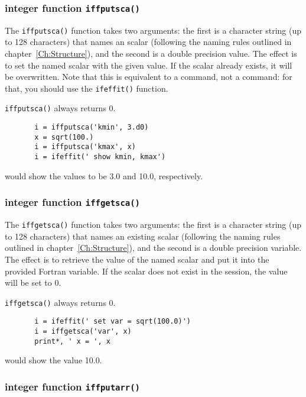 \subsubsection{integer function {\tt{iffputsca()}}}\label{Ch:Script-f77:putscalar}

{}
The {\tt{iffputsca()}} function takes two arguments: the first is a
character string (up to 128 characters) that names an {\ifeffit} scalar
(following the naming rules outlined in chapter~\ref{Ch:Structure}), and
the second is a double precision value.  The effect is to set the named
scalar with the given value.  If the scalar already exists, it will be
overwritten.  Note that this is equivalent to a {} command, not
a {} command: for that, you should use the {\tt{ifeffit()}}
function.


{\tt{iffputsca()}} always returns 0.

\begin{verbatim}
       i = iffputsca('kmin', 3.d0)
       x = sqrt(100.)
       i = iffputsca('kmax', x)
       i = ifeffit(' show kmin, kmax')
\end{verbatim}
\noindent
would show the values to be 3.0 and 10.0, respectively.

\subsubsection{integer function {\tt{iffgetsca()}}}\label{Ch:Script-f77:getscalar}

{}
The {\tt{iffgetsca()}} function takes two arguments: the first is a
character string (up to 128 characters) that names an existing {\ifeffit}
scalar (following the naming rules outlined in chapter~\ref{Ch:Structure}),
and the second is a double precision variable.  The effect is to retrieve
the value of the named {\ifeffit} scalar and put it into the provided
Fortran variable.  If the scalar does not exist in the {\ifeffit} session,
the value will be set to 0.

{\tt{iffgetsca()}} always returns 0.


\begin{verbatim}
       i = ifeffit(' set var = sqrt(100.0)')
       i = iffgetsca('var', x)
       print*, ' x = ', x
\end{verbatim}
\noindent
would show the value 10.0.

\subsubsection{integer function {\tt{iffputarr()}}}\label{Ch:Script-f77:putarr}

